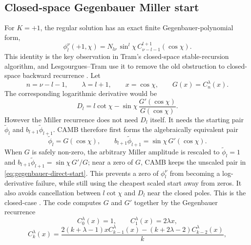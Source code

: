 \documentclass[11pt,a4paper]{article}
\newcommand{\code}[1]{\texttt{\detokenize{#1}}}
\begin{document}
\subsection{Closed-space Gegenbauer Miller start}

For \(K=+1\), the regular solution has an exact finite Gegenbauer-polynomial form,
\begin{equation}
  \phi_l^\nu(+1,\chi)=N_{l\nu}\,\sin^l\chi\,
  C_{\nu-l-1}^{l+1}(\cos\chi).
  \label{eq:gegenbauer-form}
\end{equation}
This identity is the key observation in Tram's closed-space stable-recursion algorithm, and Lesgourgues--Tram use it to remove the old obstruction to closed-space backward recurrence \cite{tram2013,lesgourgues-tram2013}.
Let
\begin{equation}
  n=\nu-l-1,\qquad \lambda=l+1,\qquad x=\cos\chi,\qquad G(x)=C_n^\lambda(x).
\end{equation}
The corresponding logarithmic derivative would be
\begin{equation}
  D_l=l\cot\chi-\sin\chi\,\frac{G'(\cos\chi)}{G(\cos\chi)}.
  \label{eq:gegenbauer-logderiv}
\end{equation}
However the Miller recurrence does not need \(D_l\) itself.  It needs the starting pair \(\widetilde\phi_l\) and \(b_{l+1}\widetilde\phi_{l+1}\).  CAMB therefore first forms the algebraically equivalent pair
\begin{equation}
  \widetilde\phi_l=G(\cos\chi),\qquad
  b_{l+1}\widetilde\phi_{l+1}=\sin\chi\,G'(\cos\chi).
  \label{eq:gegenbauer-direct-start}
\end{equation}
When \(G\) is safely non-zero, the arbitrary Miller amplitude is rescaled to \(\widetilde\phi_l=1\) and \(b_{l+1}\widetilde\phi_{l+1}=\sin\chi\,G'/G\); near a zero of \(G\), CAMB keeps the unscaled pair in \eqref{eq:gegenbauer-direct-start}.  This prevents a zero of \(\phi_l^\nu\) from becoming a log-derivative failure, while still using the cheapest scaled start away from zeros.  It also avoids cancellation between \(l\cot\chi\) and \(D_l\) near the closed poles.  This is the closed-case \code{phi_closed_gegenbauer_start}.  The code computes \(G\) and \(G'\) together by the Gegenbauer recurrence
\begin{equation}
  C_0^\lambda(x)=1,\qquad C_1^\lambda(x)=2\lambda x,
\end{equation}
\begin{equation}
  C_k^\lambda(x)=\frac{2(k+\lambda-1)xC_{k-1}^\lambda(x)-(k+2\lambda-2)C_{k-2}^\lambda(x)}{k},
\end{equation}
\end{document}
